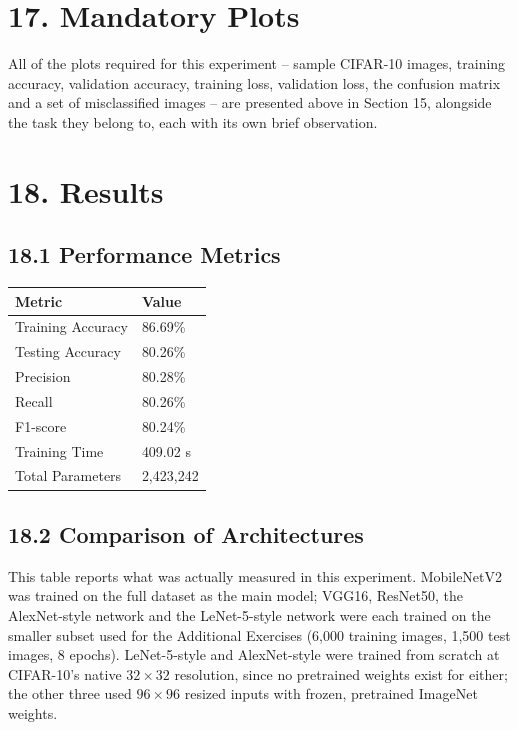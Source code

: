 \documentclass[11pt]{article}
\begin{document}

\section*{17. Mandatory Plots}

All of the plots required for this experiment -- sample CIFAR-10 images,
training accuracy, validation accuracy, training loss, validation loss,
the confusion matrix and a set of misclassified images -- are presented
above in Section 15, alongside the task they belong to, each with its own
brief observation.


\section*{18. Results}

\subsection*{18.1 Performance Metrics}

\begin{center}
\begin{tabular}{|p{6cm}|p{4cm}|}
\hline
Metric & Value\\
\hline
Training Accuracy & 86.69\%\\
\hline
Testing Accuracy & 80.26\%\\
\hline
Precision & 80.28\%\\
\hline
Recall & 80.26\%\\
\hline
F1-score & 80.24\%\\
\hline
Training Time & 409.02 s\\
\hline
Total Parameters & 2,423,242\\
\hline
\end{tabular}
\end{center}

\vspace{5mm}

\subsection*{18.2 Comparison of Architectures}

This table reports what was actually measured in this experiment.
MobileNetV2 was trained on the full dataset as the main model; VGG16,
ResNet50, the AlexNet-style network and the LeNet-5-style network were
each trained on the smaller subset used for the Additional Exercises
(6,000 training images, 1,500 test images, 8 epochs). LeNet-5-style and
AlexNet-style were trained from scratch at CIFAR-10's native
$32\times32$ resolution, since no pretrained weights exist for either;
the other three used $96\times96$ resized inputs with frozen, pretrained
ImageNet weights.
\end{document}
